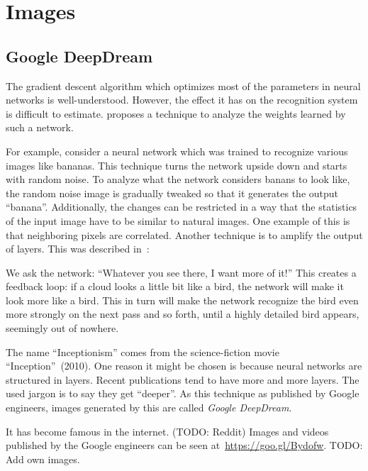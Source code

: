 
\section{Images}%
\label{sec:images}%

\subsection{Google DeepDream}%
\label{subsec:google-deepdream}%
The gradient descent algorithm which optimizes most of the parameters in neural
networks is well-understood. However, the effect it has on the recognition
system is difficult to estimate. \cite{inceptionism2015} proposes a technique
to analyze the weights learned by such a network.

For example, consider a neural network which was trained to recognize various
images like bananas. This technique turns the network upside down and starts
with random noise. To analyze what the network considers banans to look like,
the random noise image is gradually tweaked so that it generates the output
\enquote{banana}. Additionally, the changes can be restricted in a way that the
statistics of the input image have to be similar to natural images. One example
of this is that neighboring pixels are correlated.
\goodbreak
Another technique is to amplify the output of layers. This was described
in~\cite{inceptionism2015}:\nobreak%
\begin{displayquote}
We ask the network: \enquote{Whatever you see there, I want more of it!} This
creates a feedback loop: if a cloud looks a little bit like a bird, the network
will make it look more like a bird. This in turn will make the network
recognize the bird even more strongly on the next pass and so forth, until a
highly detailed bird appears, seemingly out of nowhere.
\end{displayquote}

The name \enquote{Inceptionism} comes from the science-fiction movie
\enquote{Inception}~(2010). One reason it might be chosen is because neural
networks are structured in layers. Recent publications tend to have more and
more layers. The used jargon is to say they get \enquote{deeper}. As this
technique as published by Google engineers, images generated by this are called
\textit{Google DeepDream}.

It has become famous in the internet. (TODO: Reddit)
Images and videos published by the Google engineers can be seen
at~\href{https://goo.gl/Bydofw}{https://goo.gl/Bydofw}. TODO: Add own images.


